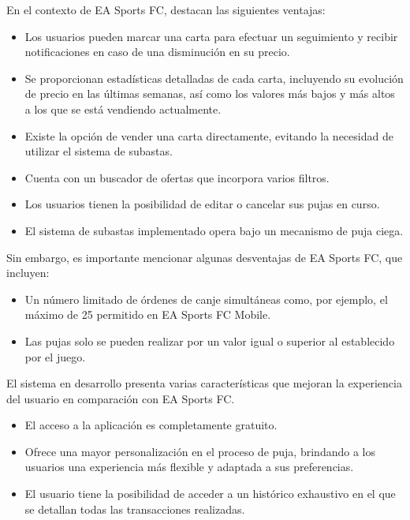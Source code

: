 En el contexto de EA Sports FC, destacan las siguientes ventajas:
\begin{itemize}
    \item Los usuarios pueden marcar una carta para efectuar un seguimiento y recibir notificaciones en caso de una disminución en su precio.
    \item Se proporcionan estadísticas detalladas de cada carta, incluyendo su evolución de precio en las últimas semanas, así como los valores más bajos y más altos a los que se está vendiendo actualmente.
    \item Existe la opción de vender una carta directamente, evitando la necesidad de utilizar el sistema de subastas. 
    \item Cuenta con un buscador de ofertas que incorpora varios filtros.
    \item Los usuarios tienen la posibilidad de editar o cancelar sus pujas en curso.
    \item El sistema de subastas implementado opera bajo un mecanismo de puja ciega.
\end{itemize}

Sin embargo, es importante mencionar algunas desventajas de EA Sports FC, que incluyen:
\begin{itemize}
    \item Un número limitado de órdenes de canje simultáneas como, por ejemplo, el máximo de 25 permitido en EA Sports FC Mobile.
    \item Las pujas solo se pueden realizar por un valor igual o superior al establecido por el juego. 
\end{itemize}

El sistema en desarrollo presenta varias características que mejoran la experiencia del usuario en comparación con EA Sports FC.

\begin{itemize}
    \item El acceso a la aplicación es completamente gratuito.
    \item Ofrece una mayor personalización en el proceso de puja, brindando a los usuarios una experiencia más flexible y adaptada a sus preferencias.
    \item El usuario tiene la posibilidad de acceder a un histórico exhaustivo en el que se detallan todas las transacciones realizadas.
\end{itemize}

